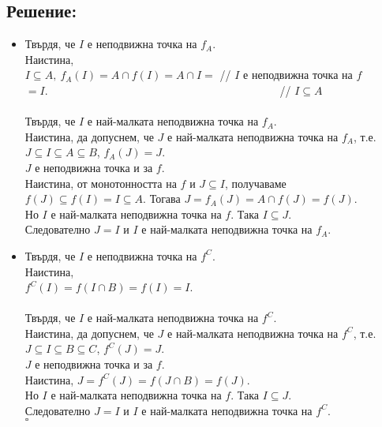 \documentclass[french]{article}
\begin{document}
	\subsection*{Решение:}
	\begin{itemize} 
		\item Твърдя, че $I$ е неподвижна точка на $f_A$. \\
		Наистина, \\ 
		$I \subseteq A,\ f_A(I) = A \cap f(I) = A \cap I =$ // $I$ е неподвижна точка на $f$ \\
		$= I$.\ \ \ \ \ \ \ \ \ \ \ \ \ \ \ \ \ \ \ \ \ \ \ \ \ \ \ \ \ \ \ \ \ \ \ \ \ \ \ \ \ \ // $I \subseteq A$ \\
		\\
		Твърдя, че  $I$ е най-малката неподвижна точка на $f_A$. \\
		Наистина, да допуснем, че $J$ е най-малката неподвижна точка на $f_A$, т.е. $J \subseteq I \subseteq A \subseteq B$, $f_A(J) = J.$ \\
		$J$ е неподвижна точка и за $f$. \\
		Наистина, от монотонността на $f$ и $J \subseteq I$, получаваме  $f(J) \subseteq f(I) = I \subseteq A$. Тогава $J = f_A(J) = A \cap f(J) = f(J)$. \\
		Но $I$ е най-малката неподвижна точка на $f$. Така $I \subseteq J$. \\
		Следователно $J = I$ и $I$ е най-малката неподвижна точка на $f_A$.
		
		\item Твърдя, че $I$ е неподвижна точка на $f^C$. \\
		Наистина, \\
		$f^C(I) = f(I \cap B) = f(I) = I$. \\
		\\
		Твърдя, че  $I$ е най-малката неподвижна точка на $f^C$. \\
		Наистина, да допуснем, че $J$ е най-малката неподвижна точка на $f^C$, т.е. $J \subseteq I \subseteq B \subseteq C$, $f^C(J) = J.$ \\
		$J$ е неподвижна точка и за $f$. \\
	    Наистина, $J = f^C(J) = f(J \cap B) = f(J)$. \\
		Но $I$ е най-малката неподвижна точка на $f$. Така $I \subseteq J$. \\
		Следователно $J = I$ и $I$ е най-малката неподвижна точка на $f^C$. \\
		$\square$		
	\end{itemize}
\end{document}
